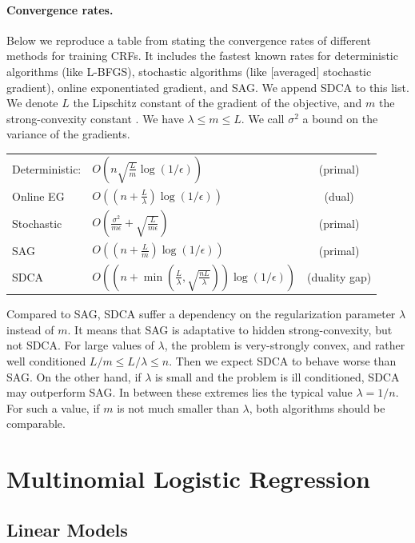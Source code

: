 \documentclass{article}
\DeclareMathOperator{\1}{\mathbb{1}}
\begin{document}
\paragraph{Convergence rates.}
Below we reproduce a table from \cite{schmidt_non-uniform_2015} stating the convergence rates of different methods for training CRFs.
It includes the fastest known rates for deterministic algorithms (like L-BFGS), stochastic algorithms (like [averaged] stochastic gradient), online exponentiated gradient, and SAG.
We append SDCA to this list.
We denote $L$ the Lipschitz constant of the gradient of the objective, and $m$ the strong-convexity constant .
We have $\lambda \leq m \leq L$.
We call $\sigma^2$ a bound on the variance of the gradients.\\
\begin{center}
\begin{tabular}{llc}
Deterministic: & $O(n\sqrt{\frac{L}{m}}\log(1/\epsilon))$ & (primal)\\
Online EG & $O((n + \frac{L}{\lambda})\log(1/\epsilon))$ & (dual)\\
Stochastic & $O(\frac{\sigma^2}{m \epsilon}+\sqrt{\frac{L}{m \epsilon}})$ & (primal)\\
SAG & $O((n + \frac{L}{m})\log(1/\epsilon))$ & (primal) \\
SDCA & $O( (n + \min( \frac{L}{\lambda}, \sqrt{\frac{n L}{\lambda}}) ) \log(1/\epsilon) )$ & (duality gap)
\end{tabular}
\end{center}
Compared to SAG, SDCA suffer a dependency on the regularization parameter $\lambda$ instead of $m$.
It means that SAG is adaptative to  hidden strong-convexity, but not SDCA.
For large values of $\lambda$, the problem is very-strongly convex, and rather well  conditioned $L/m \leq L/\lambda \leq n$.
Then we expect SDCA to behave worse than SAG.
On the other hand, if $\lambda$ is small and the problem is ill conditioned, SDCA may outperform SAG.
In between these extremes lies the typical value $\lambda=1/n$.
For such a value, if $m$ is not much smaller than $\lambda$, both algorithms should be comparable.

\section{Multinomial Logistic Regression}

\subsection{Linear Models}
\end{document}
